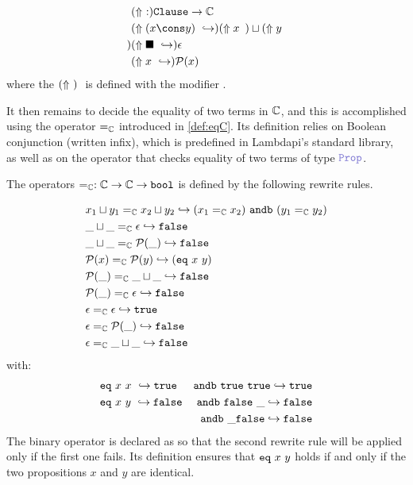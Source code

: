 \begin{definition}
\begin{align*}
& \reify{}: \texttt{Clause} \ra \bb{C} \\
&\reify{(x \cons y)} \re \reify{x} \,\sqcup \reify{y} \\
&\reify{ \blacksquare } \re \epsilon \\
&\reify{ x } \re \cal{P}(x)
\end{align*}
where the $\reify{}$ is defined with the modifier .
\label{def:reify-def}
\end{definition}
It then remains to decide the equality of two terms in $\mathbb{C}$, and this is accomplished using the operator $=_\mathbb{C}$ introduced in \cref{def:eqC}.
Its definition relies on Boolean conjunction  (written infix), which is predefined in Lambdapi's standard library, as well as on the operator  that checks equality of two terms of type $\prop$.

\begin{definition}
The operators $=_\mathbb{C} : \mathbb{C} \rightarrow \mathbb{C} \rightarrow \texttt{\upshape{bool}}$ is defined by the following rewrite rules.

\begin{align*}
&x_1 \sqcup y_1 =_\mathbb{C} x_2 \sqcup y_2 \hookrightarrow (x_1  =_\mathbb{C} x_2) ~\texttt{\upshape{andb}}~ (y_1  =_\mathbb{C} y_2) \\
&\_ \sqcup \_ =_\mathbb{C} \epsilon \hookrightarrow \texttt{\upshape{false}} \\
&\_ \sqcup \_ =_\mathbb{C} \mathcal{P}(\_) \hookrightarrow \texttt{\upshape{false}} \\
&\mathcal{P}(x) =_\mathbb{C} \mathcal{P}(y) \hookrightarrow (\texttt{\upshape{eq}}~x~y) \\
&\mathcal{P}(\_) =_\mathbb{C} \_ \sqcup \_ \hookrightarrow \texttt{\upshape{false}} \\
&\mathcal{P}(\_) =_\mathbb{C} \epsilon \hookrightarrow \texttt{\upshape{false}} \\
&\epsilon =_\mathbb{C} \epsilon \hookrightarrow \texttt{\upshape{true}} \\
&\epsilon =_\mathbb{C} \mathcal{P}(\_) \hookrightarrow \texttt{\upshape{false}} \\
&\epsilon =_\mathbb{C} \_ \sqcup \_ \hookrightarrow \texttt{\upshape{false}}
\end{align*}
with:
\begin{align*}
&\texttt{\upshape{eq}}~x~x~ \hookrightarrow \texttt{\upshape{true}}  & \texttt{\upshape{andb}}~\texttt{\upshape{true}}~\texttt{\upshape{true}} \hookrightarrow \texttt{\upshape{true}} \\
&\texttt{\upshape{eq}}~x~y~ \hookrightarrow \texttt{\upshape{false}} & \texttt{\upshape{andb}}~\texttt{\upshape{false}}~\_ \hookrightarrow \texttt{\upshape{false}} \\
& & \texttt{\upshape{andb}}~\_ \texttt{\upshape{false}} \hookrightarrow \texttt{\upshape{false}} 
\end{align*}
\label{def:eqC}
The binary operator  is declared as  so that the second rewrite rule will be applied only if the first one fails.
Its definition ensures that $\texttt{\upshape{eq}}~x~y$ holds if and only if the two propositions $x$ and $y$ are identical.
\end{definition}

